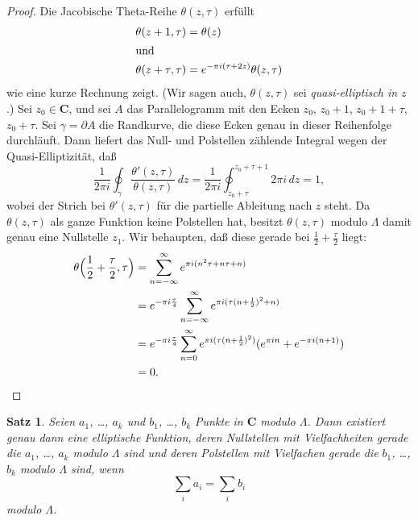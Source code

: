 \documentclass[a4paper,twoside,openright]{report}
\newtheorem{thm}{Satz}[chapter]
\theoremstyle{definition}
\theoremstyle{remark}
\begin{document}
\begin{proof}
  Die Jacobische Theta-Reihe
  $\theta(z, \tau)$ erfüllt
  \begin{align*}
    \theta(z + 1, \tau) & = \theta(z)
    \\
    \intertext{und}
    \theta(z + \tau, \tau) & = e^{-\pi i (\tau + 2 z)} \theta(z, \tau)  
  \end{align*}
  wie eine kurze Rechnung zeigt.   %
  (Wir sagen auch, $\theta(z, \tau)$ sei \emph{quasi-elliptisch in $z$}.)
  Sei $z_0 \in \mathbf C$, und sei $A$ das Parallelogramm mit den
  Ecken $z_0$, $z_0 + 1$, $z_0 + 1 + \tau$, $z_0 + \tau$. Sei $\gamma = \partial A$
  die Randkurve, die diese Ecken genau in dieser Reihenfolge durchläuft.
  Dann liefert das Null- und Polstellen zählende Integral wegen der Quasi-Elliptizität, daß
  \[
    \frac 1 {2 \pi i} \oint_\gamma \frac{\theta'(z, \tau)}{\theta(z, \tau)} \, dz
    = \frac 1 {2 \pi i} \oint_{z_0 + \tau}^{z_0 + \tau + 1} 2 \pi i \, dz
    = 1,
  \]
  wobei der Strich bei $\theta'(z, \tau)$ für die partielle Ableitung nach $z$
  steht. Da $\theta(z, \tau)$ als ganze Funktion keine Polstellen hat, besitzt
  $\theta(z, \tau)$ modulo $\Lambda$ damit genau eine Nullstelle $z_1$. Wir behaupten,
  daß diese gerade bei $\frac 1 2 + \frac\tau 2$ liegt:
  \[
    \begin{split}
      \theta\Bigl(\frac 1 2 + \frac \tau 2, \tau\Bigr)
      & = \sum_{n = -\infty}^\infty e^{\pi i (n^2 \tau + n \tau + n)}
      \\
      & = e^{- \pi i \frac\tau 4} \sum_{n = -\infty}^\infty e^{\pi i(\tau (n + \frac 1 2)^2 + n)}
      \\
      & = e^{- \pi i \frac\tau 4} \sum_{n = 0}^\infty e^{\pi i(\tau (n + \frac 1 2)^2)} (e^{\pi i n} + e^{- \pi i (n + 1)})
      \\
      & = 0.  
      \qedhere
    \end{split}
  \]
\end{proof}

\begin{thm}
  Seien $a_1$, \dots, $a_k$ und $b_1$, \dots, $b_k$ Punkte in $\mathbf C$
  modulo $\Lambda$. Dann existiert genau dann eine elliptische Funktion, deren
  Nullstellen mit Vielfachheiten gerade die $a_1$, \dots, $a_k$ modulo $\Lambda$
  sind und deren Polstellen mit Vielfachen gerade die $b_1$, \dots, $b_k$ modulo
  $\Lambda$ sind, wenn
  \[
    \sum_i a_i = \sum_i b_i
  \]
  modulo $\Lambda$.
\end{thm}
\end{document}
